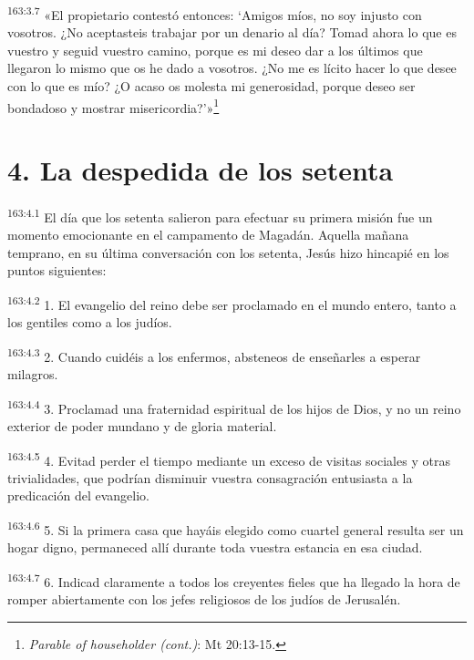 \par
\textsuperscript{163:3.7} «El propietario contestó entonces: `Amigos míos, no soy injusto con vosotros. ¿No aceptasteis trabajar por un denario al día? Tomad ahora lo que es vuestro y seguid vuestro camino, porque es mi deseo dar a los últimos que llegaron lo mismo que os he dado a vosotros. ¿No me es lícito hacer lo que desee con lo que es mío? ¿O acaso os molesta mi generosidad, porque deseo ser bondadoso y mostrar misericordia?'»\footnote{\textit{Parable of householder (cont.)}: Mt 20:13-15.}

\section*{4. La despedida de los setenta}
\par
\textsuperscript{163:4.1} El día que los setenta salieron para efectuar su primera misión fue un momento emocionante en el campamento de Magadán. Aquella mañana temprano, en su última conversación con los setenta, Jesús hizo hincapié en los puntos siguientes:

\par
\textsuperscript{163:4.2} 1. El evangelio del reino debe ser proclamado en el mundo entero, tanto a los gentiles como a los judíos.

\par
\textsuperscript{163:4.3} 2. Cuando cuidéis a los enfermos, absteneos de enseñarles a esperar milagros.

\par
\textsuperscript{163:4.4} 3. Proclamad una fraternidad espiritual de los hijos de Dios, y no un reino exterior de poder mundano y de gloria material.

\par
\textsuperscript{163:4.5} 4. Evitad perder el tiempo mediante un exceso de visitas sociales y otras trivialidades, que podrían disminuir vuestra consagración entusiasta a la predicación del evangelio.

\par
\textsuperscript{163:4.6} 5. Si la primera casa que hayáis elegido como cuartel general resulta ser un hogar digno, permaneced allí durante toda vuestra estancia en esa ciudad.

\par
\textsuperscript{163:4.7} 6. Indicad claramente a todos los creyentes fieles que ha llegado la hora de romper abiertamente con los jefes religiosos de los judíos de Jerusalén.

